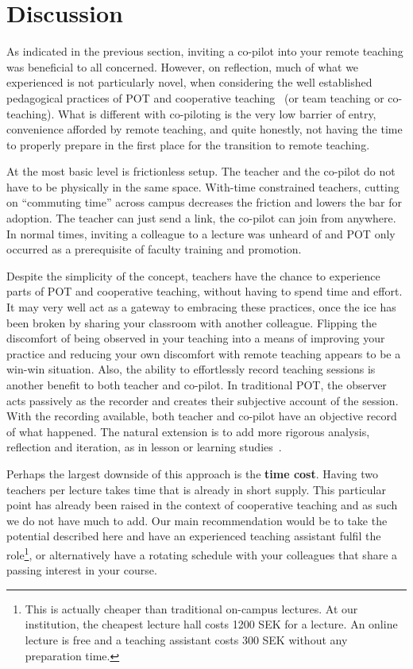 \documentclass[sigconf,natbib=false]{acmart}
\begin{document}
\section{Discussion}

As indicated in the previous section, inviting a co-pilot into your remote 
teaching was beneficial to all concerned. However, on reflection, much of what 
we experienced is not particularly novel, when considering the well established 
pedagogical practices of \ac{POT} and cooperative 
teaching~\cite{bauwens1995cooperative} (or team teaching or co-teaching). What 
is different with co-piloting is the very low barrier of entry, convenience 
afforded by remote teaching, and quite honestly, not having the time to 
properly prepare in the first place for the transition to remote teaching.

At the most basic level is frictionless setup. The teacher and the co-pilot do 
not have to be physically in the same space. With-time constrained teachers, 
cutting on \enquote{commuting time} across campus decreases the friction and 
lowers the bar for adoption. The teacher can just send a link, the co-pilot can 
join from anywhere. In normal times, inviting a colleague to a lecture was 
unheard of and \ac{POT} only occurred as a prerequisite of faculty training and 
promotion.

Despite the simplicity of the concept, teachers have the chance to experience 
parts of \ac{POT} and cooperative teaching, without having to spend time and 
effort. It may very well act as a gateway to embracing these practices, once 
the ice has been broken by sharing your classroom with another colleague. 
Flipping the discomfort of being observed in your teaching into a means of 
improving your practice and reducing your own discomfort with remote teaching 
appears to be a win-win situation. Also, the ability to effortlessly record 
teaching sessions is another benefit to both teacher and co-pilot. In 
traditional \ac{POT}, the observer acts passively as the recorder and creates 
their subjective account of the session. With the recording available, both 
teacher and co-pilot have an objective record of what happened. The natural 
extension is to add more rigorous analysis, reflection and iteration, as in 
lesson or learning studies~\cite{NecessaryConditionsOfLearning}.

Perhaps the largest downside of this approach is the \textbf{time cost}. Having 
two teachers per lecture takes time that is already in short supply. This 
particular point has already been raised in the context of cooperative teaching 
and as such we do not have much to add. Our main recommendation would be to 
take the potential described here and have an experienced teaching assistant 
fulfil the role\footnote{%
  This is actually cheaper than traditional on-campus lectures.
  At our institution, the cheapest lecture hall costs 1200 SEK for a lecture.
  An online lecture is free and a teaching assistant costs 300 SEK without any 
  preparation time.
}, or alternatively have a rotating schedule with your colleagues that share a 
passing interest in your course.
\end{document}
